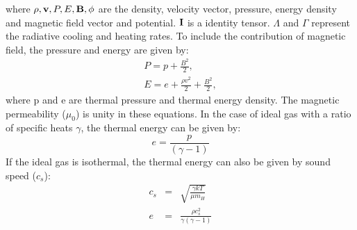 where $\rho, {\bf v}, P, E, {\bf B}, \phi$ are the density, velocity vector, pressure, energy density and magnetic field vector and potential. ${\bf I}$ is a identity tensor. $\Lambda$ and $\Gamma$ represent the radiative cooling and heating rates. To include the contribution of magnetic field, the pressure and energy are given by:
\begin{eqnarray}
    P = p + \frac{B^2}{2}, \\
    E = e + \frac{\rho v^2}{2} + \frac{B^2}{2},
\end{eqnarray}
where p and e are thermal pressure and thermal energy density. The magnetic permeability ($\mu_0$) is unity in these equations. In the case of ideal gas with a ratio of specific heats $\gamma$, the thermal energy can be given by:
\begin{equation}
    e = \frac{p}{(\gamma - 1)}
\end{equation}
If the ideal gas is isothermal, the thermal energy can also be given by sound speed ($c_s$):
\begin{eqnarray}
    c_s & = & \sqrt{\frac{\gamma kT}{\mu m_H}}  \\
    e & = & \frac{\rho c_s^2}{\gamma (\gamma-1)}
\end{eqnarray}






